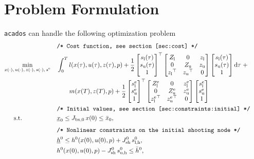\documentclass[english]{article}
\newcommand{\acados}{\texttt{acados}}
\newcommand{\tran}{^\top}
\newcommand{\ind}[1]{_{\textrm{#1}}}
\newcommand{\terminal}{^{\textrm{e}}}
\newcommand{\initial}{^{\textrm{0}}}
\newcommand{\matr}[1]{\begin{bmatrix}#1\end{bmatrix}}
\newcommand{\Lower}{\ind{l}}
\newcommand{\lowerh}{\ind{l,h}}
\newcommand{\upper}{\ind{u}}
\newcommand{\mathComment}[1]{\texttt{/* #1 */}}
\begin{document}
%
\section{Problem Formulation}\label{sec:problem}
%
\acados{} can handle the following optimization problem
%
\begin{align}
    &&&\mathComment{Cost function, see section \ref{sec:cost}}\nonumber\\
    &\underset{\begin{subarray}{c}
        x(\cdot),\,u(\cdot), \, z(\cdot), \, s(\cdot), \, s\terminal
        \end{subarray}}{\min}
    &&\int_0^T l(x(\tau), u(\tau), z(\tau), p)
     + \frac{1}{2} \matr{s\Lower(\tau) \\ s\upper(\tau) \\ 1} \tran
      \matr{ Z\Lower & 0 & z\Lower \\
      0 & Z\upper & z\upper \\
        {z\Lower}\tran & {z\upper}\tran & 0}
    \matr{s\Lower(\tau) \\ s\upper(\tau) \\ 1} \mathrm{d}\tau \; + \nonumber\\
     &&& \quad \quad m(x(T), z(T), p) +
      \frac{1}{2} \matr{s\Lower\terminal \\ s\upper\terminal \\ 1} \tran
     \matr{ Z\Lower\terminal & 0 & z\Lower\terminal \\
         0 & Z\upper\terminal & z\upper\terminal \\
         {z\Lower\terminal}\tran & {z\upper\terminal}\tran & 0}
     \matr{s\Lower\terminal \\ s\upper\terminal \\ 1}
     \label{eq:cost}\\
    &&&\mathComment{Initial values, see section \ref{sec:constraints:initial}}\nonumber\\
    &\,\,\,\quad \text{s.t.}    &&\underline{x}_0 \leq J_{\textrm{bx},0} \, x(0) \leq \bar{x}_0 , && \label{eq:constraints:initial}\\[1ex]
    &&&\mathComment{Nonlinear constraints on the initial shooting node} \nonumber\\
    &&&\underline{h}\initial \leq h\initial(x(0), u(0), p) + J_{\textrm{sh}}\initial \, s\lowerh\initial, &&\label{eq:constraints:path:lower_bounds:start}\\
    &&& h\initial(x(0), u(0), p) - J\ind{sh}\initial\, s\ind{u,h}\initial \leq \bar{h}\initial, &&\label{eq:constraints:path:upper_bounds:start}\\

\end{align}
\end{document}
